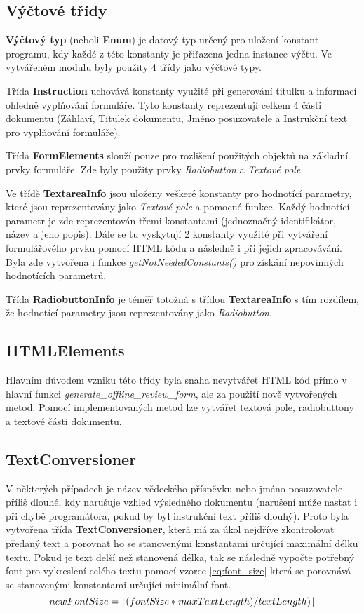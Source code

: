 \subsection{Výčtové třídy}
\textbf{Výčtový typ} (neboli \textbf{Enum}) je datový typ určený pro uložení konstant programu, kdy každé z této konstanty je přiřazena jedna instance výčtu. Ve vytvářeném modulu byly použity 4 třídy jako výčtové typy. 
\par
Třída \textbf{Instruction} uchovává konstanty využité při generování titulku a informací ohledně vyplňování formuláře. Tyto konstanty reprezentují celkem 4 části dokumentu (Záhlaví, Titulek dokumentu, Jméno posuzovatele a Instrukční text pro vyplňování formuláře).
\par
Třída \textbf{FormElements} slouží pouze pro rozlišení použitých objektů na základní prvky formuláře. Zde byly použity prvky \textit{Radiobutton} a \textit{Textové pole}.
\par
Ve třídě \textbf{TextareaInfo} jsou uloženy veškeré konstanty pro hodnotící parametry, které jsou reprezentovány jako \textit{Textové pole} a pomocné funkce. Každý hodnotící parametr je zde reprezentován třemi konstantami (jednoznačný identifikátor, název a jeho popis). Dále se tu vyskytují 2 konstanty využité při vytváření formulářového prvku pomocí HTML kódu a následně i při jejich zpracovávání. Byla zde vytvořena i funkce \textit{getNotNeededConstants()} pro získání nepovinných hodnotících parametrů.
\par
Třída \textbf{RadiobuttonInfo} je téměř totožná s třídou \textbf{TextareaInfo} s tím rozdílem, že hodnotící parametry jsou reprezentovány jako \textit{Radiobutton}.
\subsection{HTMLElements}
Hlavním důvodem vzniku této třídy byla snaha nevytvářet HTML kód přímo v hlavní funkci \textit{generate\_offline\_review\_form}, ale za použití nově vytvořených metod. Pomocí implementovaných metod lze vytvářet textová pole, radiobuttony a textové části dokumentu.
\subsection{TextConversioner}
V některých případech je název vědeckého příspěvku nebo jméno posuzovatele příliš dlouhé, kdy narušuje vzhled výsledného dokumentu (narušení může nastat i při chybě programátora, pokud by byl instrukční text příliš dlouhý). Proto byla vytvořena třída \textbf{TextConversioner}, která má za úkol nejdříve zkontrolovat předaný text a porovnat ho se stanovenými konstantami určující maximální délku textu. Pokud je text delší než stanovená délka, tak se následně vypočte potřebný font pro vykreslení celého textu pomocí vzorce \eqref{eq:font_size} která se porovnává se stanovenými konstantami určující minimální font. 
\begin{equation}
newFontSize = \floor*{(fontSize *  maxTextLength) / textLength)} \label{eq:font_size}
\end{equation}

